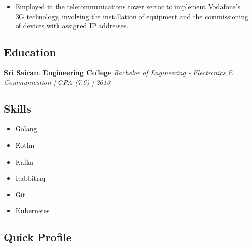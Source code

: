 \documentclass[11pt, oneside]{article}
\begin{document}
\begin{itemize}
  \item Employed in the telecommunications tower sector to implement Vodafone's 3G technology, involving the installation of equipment and the commissioning of devices with assigned IP addresses.

\end{itemize}

\medskip
\subsection*{Education}
\textbf{Sri Sairam Engineering College}
\hfill
\textit{Bachelor of Engineering - Electronics \& Communication | GPA (7.6) | 2013}

\medskip
\subsection*{Skills}
\begin{multicols}{3}
  \begin{itemize}
    \item Golang
    \item Kotlin
    \item Kafka
    \item Rabbitmq
    \item Git
    \item Kubernetes
  \end{itemize}
\end{multicols}

\medskip
\subsection*{Quick Profile}
\begin{figure}[h!]
\centering
{}
\end{figure}
\end{document}
